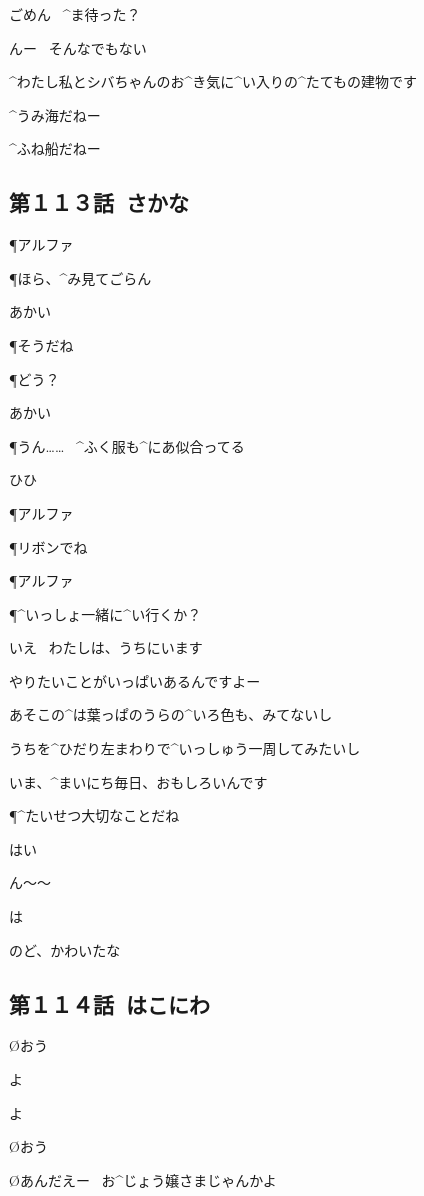 \page
\K ごめん
\ ^{ま}{待}った？

\SH んー
\ そんなでもない

\K ^{わたし}{私}とシバちゃんのお^{き}{気}に^{い}{入}りの^{たてもの}{建物}です

\page
\SH ^{うみ}{海}だねー

\K ^{ふね}{船}だねー


\subsection{第１１３話\ さかな}

\page[32]
\P アルファ

\page
\P ほら、^{み}{見}てごらん

\A あかい

\P そうだね

\page[35]
\P どう？

\A あかい

\P うん……
\ ^{ふく}{服}も^{にあ}{似合}ってる

\A ひひ

\page[37]
\P アルファ

\P リボンでね

\page[39]
\P アルファ

\page
\P ^{いっしょ}{一緒}に^{い}{行}くか？

\A いえ
\ わたしは、うちにいます

\page
\A やりたいことがいっぱいあるんですよー

\A あそこの^{は}{葉}っぱのうらの^{いろ}{色}も、みてないし

\A うちを^{ひだり}{左}まわりで^{いっしゅう}{一周}してみたいし

\A いま、^{まいにち}{毎日}、おもしろいんです

\P ^{たいせつ}{大切}なことだね

\A はい

\page[43]
\A ん〜〜

\A は

\page
\A のど、かわいたな


\subsection{第１１４話\ はこにわ}

\page[47]
\O おう

\M よ

\A よ

\page
\O おう

\O あんだえー
\ お^{じょう}{嬢}さまじゃんかよ

